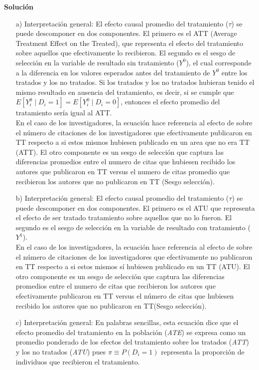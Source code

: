 \documentclass[a4paper, answers, addpoints, 11pt]{exam}
\newenvironment{solucion}{%
  \begin{mdframed}[
    backgroundcolor=blue!5,    %
    linecolor=blue!50,          %
    linewidth=2pt,              %
    leftmargin=10pt,            %
    rightmargin=8pt,           %
    topline=true,              %
    bottomline=true,            %
    roundcorner=10pt,           %
    innerleftmargin=10pt,       %
    innerrightmargin=10pt,      %
    innerbottommargin=10pt,     %
    innertopmargin=10pt         %
  ]%
  \begin{tcolorbox}[colframe=blue!50!black, colback=blue!50, coltitle=white, sharp corners=all, boxrule=1mm, width=\textwidth, halign=left, valign=center, top=0mm, bottom=0mm, left=0mm, right=0mm] \textbf{Solución} \end{tcolorbox} }{\end{mdframed}}
\begin{document}
 \begin{solucion}
 \begin{itemize}
     \item [a)] Interpretación general: El efecto causal promedio del tratamiento ($\tau$) se puede descomponer en dos componentes. El primero es el ATT (Average Treatment Effect on the Treated), que representa el efecto del tratamiento sobre aquellos que efectivamente lo recibieron. El segundo es el sesgo de selección en la variable de resultado sin tratamiento ($Y^0$), el cual corresponde a la diferencia en los valores esperados antes del tratamiento de $Y^0$ entre los tratados y los no tratados. Si los tratados y los no tratados hubieran tenido el mismo resultado en ausencia del tratamiento, es decir, si se cumple que $E[Y_i^0 \mid D_i=1] = E[Y_i^0 \mid D_i=0]$, entonces el efecto promedio del tratamiento sería igual al ATT.\\

     En el caso de los investigadores, la ecuación hace referencia al efecto de sobre el número de citaciones de los investigadores que efectivamente publicaron en TT respecto a si estos mismos hubiesen publicado en un area que no era TT (ATT). El otro componente es un sesgo de selección que captura las diferencias promedios entre el numero de citas que hubiesen recibido los autores que publicaron en TT versus el numero de citas promedio que recibieron los autores que no publicaron en TT (Sesgo selección).

      \item [b)] Interpretación general: El efecto causal promedio del tratamiento ($\tau$) se puede descomponer en dos componentes. El primero es el ATU que representa el efecto de ser tratado tratamiento sobre aquellos que no lo fueron. El segundo es el sesgo de selección en la variable de resultado con tratamiento ($Y^1$).\\

     En el caso de los investigadores, la ecuación hace referencia al efecto de sobre el número de citaciones de los investigadores que efectivamente no publicaron en TT respecto a si estos mismos sí hubiesen publicado en un TT (ATU). El otro componente es un sesgo de selección que captura las diferencias promedios entre el numero de citas que recibieron los autores que efectivamente publicaron en TT versus el número de citas que hubiesen recibido los autores que no publicaron en TT(Sesgo selección).

      \item [c)] Interpretación general: En palabras sencillas, esta ecuación dice que el efecto promedio del tratamiento en la población (\textit{ATE}) se expresa como un promedio ponderado de los efectos del tratamiento sobre los tratados (\textit{ATT}) y los no tratados (\textit{ATU})  pues  \(\pi \equiv P(D_i = 1)\) representa la proporción de individuos que recibieron el tratamiento. \\


\end{itemize}
\end{solucion}
\end{document}
